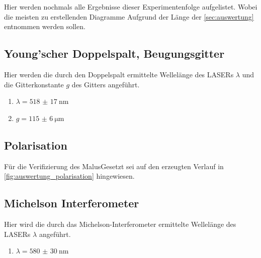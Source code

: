 \documentclass[12pt,english,ngerman]{scrartcl}
\begin{document}
Hier werden nochmals alle Ergebnisse dieser Experimentenfolge aufgelistet.
Wobei die meisten zu erstellenden Diagramme Aufgrund der Länge der
\autoref{sec:auswertung} entnommen werden sollen.

\subsection{Young'scher Doppelspalt, Beugungsgitter}

Hier werden die durch den Doppelspalt ermittelte Wellelänge des LASERs
$\lambda$ und die Gitterkonstante $g$ des Gitters angeführt.

\begin{enumerate}
	\item $\lambda = \SI{518(17)}{\nm}$
	\item $g = \SI{115(6)}{\um}$
\end{enumerate}

\subsection{Polarisation}

Für die Verifizierung des MalusGesetzt sei auf den erzeugten Verlauf in 
\autoref{fig:auswertung_polarisation} hingewiesen.

\subsection{Michelson Interferometer}
Hier wird die durch das Michelson-Interferometer ermittelte Wellelänge des LASERs
$\lambda$ angeführt.
\begin{enumerate}
	\item $\lambda = \SI{580(30)}{\nm}$
\end{enumerate}

\newpage
\printbibliography
\listoffigures
\listoftables
\end{document}
